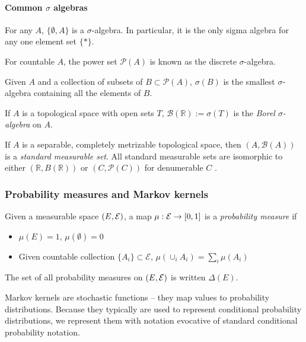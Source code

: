 \paragraph{Common $\sigma$ algebras}

For any $A$, $\{\emptyset,A\}$ is a $\sigma$-algebra. In particular, it is the only sigma algebra for any one element set $\{*\}$.

For countable $A$, the power set $\mathscr{P}(A)$ is known as the discrete $\sigma$-algebra.

Given $A$ and a collection of subsets of $B\subset\mathscr{P}(A)$, $\sigma(B)$ is the smallest $\sigma$-algebra containing all the elements of $B$. 

If $A$ is a topological space with open sets $T$, $\mathcal{B}(\mathbb{R}):=\sigma(T)$ is the \emph{Borel $\sigma$-algebra} on $A$.

If $A$ is a separable, completely metrizable topological space, then $(A,\mathcal{B}(A))$ is a \emph{standard measurable set}. All standard measurable sets are isomorphic to either $(\mathbb{R},B(\mathbb{R}))$ or $(C,\mathscr{P}(C))$ for denumerable $C$ \citep[Chap. 1]{cinlar_probability_2011}.

\subsubsection{Probability measures and Markov kernels}

\begin{definition}\label{def:prob_meas}
Given a measurable space $(E,\mathcal{E})$, a map $\mu:\mathcal{E}\to [0,1]$ is a \emph{probability measure} if
\begin{itemize}
	\item $\mu(E)=1$, $\mu(\emptyset)=0$
	\item Given countable collection $\{A_i\}\subset\mathscr{E}$, $\mu(\cup_{i} A_i) = \sum_i \mu(A_i)$
\end{itemize}
\end{definition}

\begin{notation}\label{no:prob_meas_set}
The set of all probability measures on $(E,\mathcal{E})$ is written $\Delta(E)$.
\end{notation}

Markov kernels are stochastic functions -- they map values to probability distributions. Because they typically are used to represent conditional probability distributions, we represent them with notation evocative of standard conditional probability notation.

